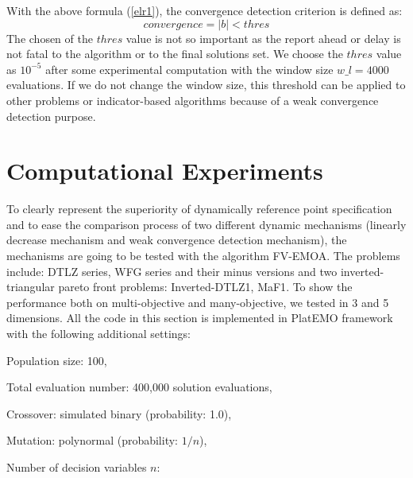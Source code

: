 \documentclass[conference]{IEEEtran}
\begin{document}
With the above formula (\ref{elr1}), the convergence detection criterion is defined as:
\begin{equation}\label{elr2}
  convergence = \lvert b \rvert < thres
\end{equation}
The chosen of the $thres$ value is not so important 
as the report ahead or delay is not fatal to the algorithm or to the final solutions set.
We choose the $thres$ value as $10^{-5}$ after some experimental computation with 
the window size $w\_ l = 4000$ evaluations. 
If we do not change the window size, 
this threshold can be applied to other problems or indicator-based algorithms
because of a weak convergence detection purpose.

% 
% 
%
\section{Computational Experiments}
To clearly represent the superiority of dynamically reference point specification 
and to ease the comparison process of two different dynamic mechanisms
(linearly decrease mechanism and weak convergence detection mechanism), 
the mechanisms are going to be tested with the algorithm FV-EMOA\cite{FVEMOA}.
The problems include: 
DTLZ series\cite{DTLZ}, WFG series\cite{WFG} and their minus versions\cite{minusTestProblem}
and two inverted-triangular pareto front problems: 
Inverted-DTLZ1\cite{hisao:RPexplanation}, MaF1\cite{MaF}.
To show the performance both on multi-objective and many-objective, we tested in 3 and 5 dimensions.
All the code in this section is implemented in PlatEMO framework\cite{PlatEMO} 
with the following additional settings:

Population size: 100, 

Total evaluation number: 400,000 solution evaluations,

Crossover: simulated binary (probability: 1.0),

Mutation: polynormal (probability: $1/n$),

Number of decision variables $n$:
\end{document}
